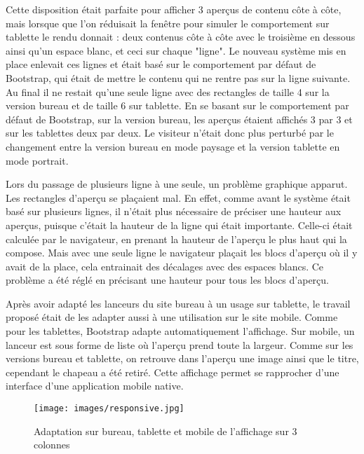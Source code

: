 \documentclass[12pt,a4paper]{article}
\begin{document}
Cette disposition était parfaite pour afficher 3 aperçus de contenu côte à côte, mais lorsque que l'on réduisait la fenêtre pour simuler le comportement sur tablette le rendu donnait : deux contenus côte à côte avec le troisième en dessous ainsi qu'un espace blanc, et ceci sur chaque "ligne". Le nouveau système mis en place enlevait ces lignes et était basé sur le comportement par défaut de Bootstrap, qui était de mettre le contenu qui ne rentre pas sur la ligne suivante. Au final il ne restait qu'une seule ligne avec des rectangles de taille 4 sur la version bureau et de taille 6 sur tablette. En se basant sur le comportement par défaut de Bootstrap, sur la version bureau, les aperçus étaient affichés 3 par 3 et sur les tablettes deux par deux. Le visiteur n'était donc plus perturbé par le changement entre la version bureau en mode paysage et la version tablette en mode portrait.\par
\medskip
Lors du passage de plusieurs ligne à une seule, un problème graphique apparut. Les rectangles d'aperçu se plaçaient mal. En effet, comme avant le système était basé sur plusieurs lignes, il n'était plus nécessaire de préciser une hauteur aux aperçus, puisque c'était la hauteur de la ligne qui était importante. Celle-ci était calculée par le navigateur, en prenant la hauteur de l'aperçu le plus haut qui la compose. Mais avec une seule ligne le navigateur plaçait les blocs d'aperçu où il y avait de la place, cela entrainait des décalages avec des espaces blancs. Ce problème a été réglé en précisant une hauteur pour tous les blocs d'aperçu.\par 
\bigskip
Après avoir adapté les lanceurs du site bureau à un usage sur tablette, le travail proposé était de les adapter aussi à une utilisation sur le site mobile. Comme pour les tablettes, Bootstrap adapte automatiquement l'affichage. Sur mobile, un lanceur est sous forme de liste où l'aperçu prend toute la largeur. Comme sur les versions bureau et tablette, on retrouve dans l'aperçu une image ainsi que le titre, cependant le chapeau a été retiré. Cette affichage permet se rapprocher d'une interface d'une application mobile native.\par


\begin{figure}[h!]
\centering\texttt{[image: images/responsive.jpg]} 
\caption{Adaptation sur bureau, tablette et mobile de l'affichage sur 3 colonnes}
\end{figure}
\newpage
\end{document}
